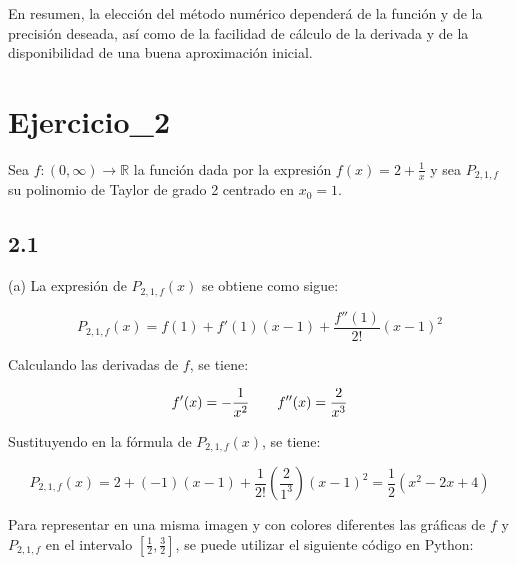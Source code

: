 \documentclass[12pt]{article}
\begin{document}
      En resumen, la elección del método numérico dependerá de la función y de la precisión deseada, así como de la facilidad de cálculo de la derivada y de la disponibilidad de una buena aproximación inicial.

    
    \section{Ejercicio_2}
    
    Sea $f : (0, \infty) \to \mathbb{R}$ la función dada por la expresión $f(x) = 2+ \frac{1}{x}$ y sea $P_{2,1,f}$ su polinomio de Taylor de grado 2 centrado en $x_0 = 1$.
      
      \subsection{2.1}

        (a) La expresión de $P_{2,1,f}(x)$ se obtiene como sigue:

        \begin{equation}
          
          P_{2,1,f}(x)= f(1)+ f'(1)(x-1)+\frac{f''(1)}{2!}(x-1)^2

        \end{equation}  

        Calculando las derivadas de $f$, se tiene:

        \begin{equation}

          f'(x)= -\frac{1}{x^2} \hspace{20px} f''(x)= \frac{2}{x^3}
        
        \end{equation}  

        Sustituyendo en la fórmula de $P_{2,1,f}(x)$, se tiene:

        \begin{equation}
          
          P_{2,1,f}(x)= 2+(-1)(x-1)+\frac{1}{2!}(\frac{2}{1^3})(x-1)^2= \frac{1}{2}(x^2-2x+4)

        \end{equation}  

        Para representar en una misma imagen y con colores diferentes las gráficas de $f$ y $P_{2,1,f}$ en el intervalo $\left[\frac{1}{2}, \frac{3}{2}\right]$, se puede utilizar el siguiente código en Python:
\end{document}

